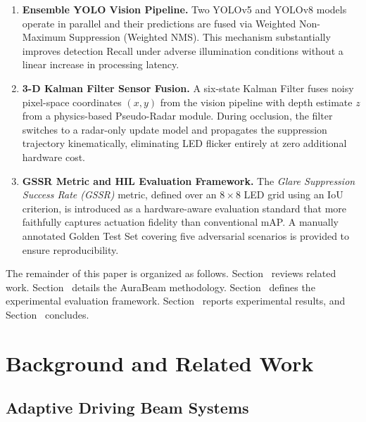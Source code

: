 \documentclass{jstarticle}
\theoremstyle{remark}
\begin{document}
\begin{enumerate}[label=\textbf{C\arabic*.}]
    \item \textbf{Ensemble YOLO Vision Pipeline.}
          Two YOLOv5 and YOLOv8 models operate in parallel and their
          predictions are fused via Weighted Non-Maximum Suppression
          (Weighted NMS). This mechanism substantially improves
          detection Recall under adverse illumination conditions
          without a linear increase in processing latency.

    \item \textbf{3-D Kalman Filter Sensor Fusion.}
          A six-state Kalman Filter fuses noisy pixel-space coordinates
          $(x,y)$ from the vision pipeline with depth estimate $z$ from
          a physics-based Pseudo-Radar module. During occlusion, the
          filter switches to a radar-only update model and propagates
          the suppression trajectory kinematically, eliminating LED
          flicker entirely at zero additional hardware cost.

    \item \textbf{GSSR Metric and HIL Evaluation Framework.}
          The \emph{Glare Suppression Success Rate (GSSR)} metric,
          defined over an $8\times8$ LED grid using an IoU criterion,
          is introduced as a hardware-aware evaluation standard that
          more faithfully captures actuation fidelity than conventional
          mAP. A manually annotated Golden Test Set covering five
          adversarial scenarios is provided to ensure reproducibility.
\end{enumerate}

The remainder of this paper is organized as follows.
Section~ reviews related work.
Section~ details the AuraBeam methodology.
Section~ defines the experimental evaluation
framework.
Section~ reports experimental results, and
Section~ concludes.

\section{Background and Related Work}
\label{sec:related}

\subsection{Adaptive Driving Beam Systems}
\label{subsec:adb}
\end{document}
